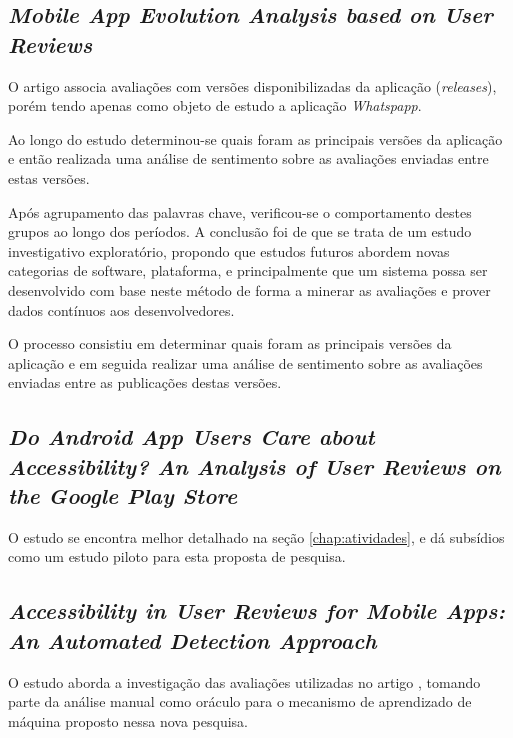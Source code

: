 \subsection{\textit{Mobile App Evolution Analysis based on User Reviews}}
O artigo \cite{Li2018MobileAE} associa avaliações com versões disponibilizadas da aplicação (\textit{releases}), porém tendo apenas como objeto de estudo a aplicação \textit{Whatspapp}.

Ao longo do estudo determinou-se quais foram as principais versões da aplicação e então realizada uma análise de sentimento sobre as avaliações enviadas entre estas versões.

Após agrupamento das palavras chave, verificou-se o comportamento destes grupos ao longo dos períodos. A conclusão foi de que se trata de um estudo investigativo exploratório, propondo que estudos futuros abordem novas categorias de software, plataforma, e principalmente que um sistema possa ser desenvolvido com base neste método de forma a minerar as avaliações e prover dados contínuos aos desenvolvedores.

O processo consistiu em determinar quais foram as principais versões da aplicação e em seguida realizar uma análise de sentimento sobre as avaliações enviadas entre as publicações destas versões.

\subsection{\textit{Do Android App Users Care about Accessibility? An Analysis of User Reviews on the Google Play Store}}
O estudo \cite{ihc2019} se encontra melhor detalhado na seção \ref{chap:atividades}, e dá subsídios como um estudo piloto para esta proposta de pesquisa.

\subsection{\textit{Accessibility in User Reviews for Mobile Apps: An Automated Detection Approach}}
O estudo \cite{rochestertamjeed} aborda a investigação das avaliações utilizadas no artigo \cite{ihc2019}, tomando parte da análise manual como oráculo para o mecanismo de aprendizado de máquina proposto nessa nova pesquisa.


